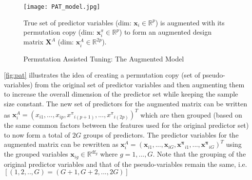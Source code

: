 \begin{figure}[H]
\centering
\texttt{[image: PAT\_model.jpg]}
\caption{Permutation Assisted Tuning: The Augmented Model}%
{True set of predictor variables (dim: $\mathbf{x}_i\in\mathbb{R}^p$) is augmented with its permutation copy (dim: $\mathbf{x}_i^{\pi}\in\mathbb{R}^p$) to form an augmented design matrix $\mathbf{X}^A$ (dim: $\mathbf{x}_i^{A}\in\mathbb{R}^{2p}$).}
\label{fig:pat}
\end{figure}
\autoref{fig:pat} illustrates the idea of creating a permutation copy (set of pseudo-variables) from the original set of predictor variables and then augmenting them to increase the overall dimension of the predictor set while keeping the sample size constant. The new set of predictors for the augmented matrix can be written as $\mathbf{x}_i^A = ({x}_{i1}, ...,{x}_{ip}, {x^{\pi}}_{i(p+1)}, ...,{x^{\pi}}_{i(2p)})^T$ which are then grouped (based on the same common factors between the features used for the original predictor set) to now form a total of $2G$ groups of predictors. The predictor variables for the augmented matrix can be rewritten as $\mathbf{x}_i^A=(\mathbf{x}_{i1}, ..., \mathbf{x}_{iG},\mathbf{x^{\pi}}_{i1}, ..., \mathbf{x^{\pi}}_{iG})^T$ using the grouped variables $\mathbf{x}_{ig}\in\mathbb{R}^{\text{df}_g}$ where $g=1, ..., G$. Note that the grouping of the original predictor variables and that of the pseudo-variables remain the same, i.e. $[(1,2,..,G) = (G+1, G+2, ..., 2G)]$\par


